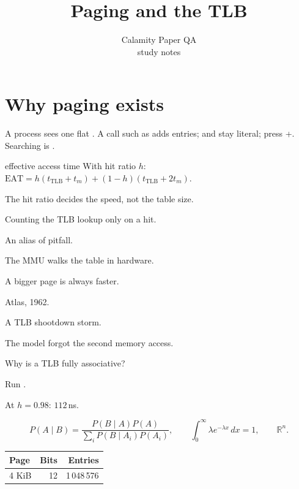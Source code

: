 \documentclass[11pt,a4paper]{article}
\title{Paging and the TLB}
\author{Calamity Paper QA \\ \small study notes}
\date{}
\begin{document}
\maketitle
\section{Why paging exists}
A process sees one flat . A call such as 
adds entries;  and  stay literal; press +.
Searching is .
\begin{definition}{effective access time}
With hit ratio $h$: $\mathrm{EAT} = h(t_{\mathrm{TLB}} + t_m) + (1-h)(t_{\mathrm{TLB}} + 2t_m)$.
\end{definition}
\begin{keyidea}The hit ratio decides the speed, not the table size.\end{keyidea}
\begin{pitfall}Counting the TLB lookup only on a hit.\end{pitfall}
\begin{gotcha}An alias of pitfall.\end{gotcha}
\begin{underthehood}The MMU walks the table in hardware.\end{underthehood}
\begin{misconception}A bigger page is always faster.\end{misconception}
\begin{origin}Atlas, 1962.\end{origin}
\begin{outage}A TLB shootdown storm.\end{outage}
\begin{aiwatch}The model forgot the second memory access.\end{aiwatch}
\begin{interview}Why is a TLB fully associative?\end{interview}
\begin{tryit}Run .\end{tryit}
\begin{example}At $h=0.98$: $112$\,ns.\end{example}
\[ P(A\mid B)=\frac{P(B\mid A)P(A)}{\sum_i P(B\mid A_i)P(A_i)},\qquad \int_0^\infty \lambda e^{-\lambda x}\,dx=1,\qquad \mathbb{R}^{n}. \]
\begin{tabular}{@{}lrr@{}}\toprule Page & Bits & Entries\\\midrule 4 KiB & 12 & 1\,048\,576\\\bottomrule\end{tabular}
\end{document}
